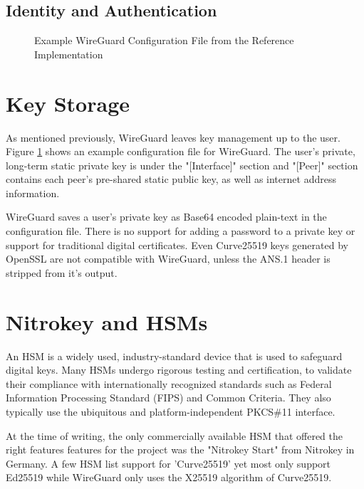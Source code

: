 \documentclass [11pt, proquest] {uwthesis}[2020/02/24]
\begin{document}
\subsection {Identity and Authentication}
\label{identity}

\begin{figure}[ht]
\caption{Example WireGuard Configuration File from the Reference Implementation}
\label{fig:wg_config}
\end{figure}

\section{Key Storage}
As mentioned previously, WireGuard leaves key management up to the user.
Figure \ref{fig:wg_config} shows an example configuration file for WireGuard. The user's private, long-term static private key is under the "[Interface]" section and "[Peer]" section contains each peer's pre-shared static public key, as well as internet address information.

WireGuard saves a user's private key as Base64 encoded plain-text in the configuration file. There is no support for adding a password to a private key or support for traditional digital certificates. Even Curve25519 keys generated by OpenSSL are not compatible with WireGuard, unless the ANS.1 header is stripped from it's output.

\section{Nitrokey and HSMs}
An HSM is a widely used, industry-standard device that is used to safeguard digital keys. Many HSMs undergo rigorous testing and certification, to validate their compliance with internationally recognized standards such as Federal Information Processing Standard (FIPS) and Common Criteria. They also typically use the ubiquitous and platform-independent PKCS\#11 interface. 

At the time of writing, the only commercially available HSM that offered the right features features for the project was the "Nitrokey Start" from Nitrokey in Germany\cite{noauthor_nitrokey_2022}. A few HSM list support for 'Curve25519' yet most only support Ed25519 while WireGuard only uses the X25519 algorithm of Curve25519.
\end{document}
